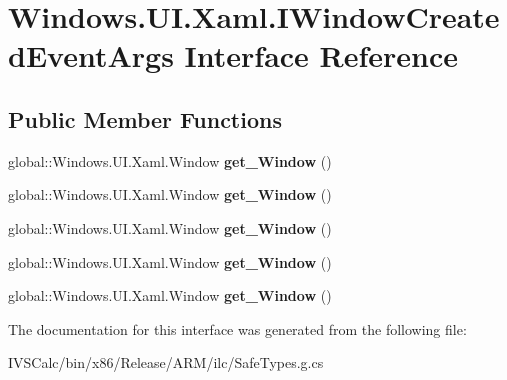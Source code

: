 \hypertarget{interface_windows_1_1_u_i_1_1_xaml_1_1_i_window_created_event_args}{}\section{Windows.\+U\+I.\+Xaml.\+I\+Window\+Created\+Event\+Args Interface Reference}
\label{interface_windows_1_1_u_i_1_1_xaml_1_1_i_window_created_event_args}
\subsection*{Public Member Functions}
\begin{DoxyCompactItemize}
\item 
\mbox{\label{interface_windows_1_1_u_i_1_1_xaml_1_1_i_window_created_event_args_a17796ddbf1a49d36b956872ad6a13770}} 
global\+::\+Windows.\+U\+I.\+Xaml.\+Window {\bfseries get\+\_\+\+Window} ()
\item 
\mbox{\label{interface_windows_1_1_u_i_1_1_xaml_1_1_i_window_created_event_args_a17796ddbf1a49d36b956872ad6a13770}} 
global\+::\+Windows.\+U\+I.\+Xaml.\+Window {\bfseries get\+\_\+\+Window} ()
\item 
\mbox{\label{interface_windows_1_1_u_i_1_1_xaml_1_1_i_window_created_event_args_a17796ddbf1a49d36b956872ad6a13770}} 
global\+::\+Windows.\+U\+I.\+Xaml.\+Window {\bfseries get\+\_\+\+Window} ()
\item 
\mbox{\label{interface_windows_1_1_u_i_1_1_xaml_1_1_i_window_created_event_args_a17796ddbf1a49d36b956872ad6a13770}} 
global\+::\+Windows.\+U\+I.\+Xaml.\+Window {\bfseries get\+\_\+\+Window} ()
\item 
\mbox{\label{interface_windows_1_1_u_i_1_1_xaml_1_1_i_window_created_event_args_a17796ddbf1a49d36b956872ad6a13770}} 
global\+::\+Windows.\+U\+I.\+Xaml.\+Window {\bfseries get\+\_\+\+Window} ()
\end{DoxyCompactItemize}


The documentation for this interface was generated from the following file\+:\begin{DoxyCompactItemize}
\item 
I\+V\+S\+Calc/bin/x86/\+Release/\+A\+R\+M/ilc/Safe\+Types.\+g.\+cs\end{DoxyCompactItemize}
